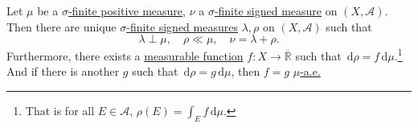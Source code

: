\begin{theorem}\label{thm:Lebesgue-Radon-Nikodym-theorem}
	Let \(\mu\) be a \hyperref[def:finite-signed-measure]{\(\sigma\)-finite positive measure}, \(\nu\) a \hyperref[def:finite-signed-measure]{\(\sigma\)-finite signed measure}
	on \((X, \mathcal{A})\). Then there are unique \hyperref[def:finite-signed-measure]{\(\sigma\)-finite signed measures} \(\lambda,\rho\) on \((X, \mathcal{A})\)
	such that
	\[
		\lambda \perp \mu, \quad \rho \ll \mu, \quad \nu = \lambda + \rho.
	\]
	Furthermore, there exists a \hyperref[def:measurable-function]{measurable function} \(f \colon X \to \overline{\mathbb{R}}\)
	such that \(\,\mathrm{d} \rho = f \,\mathrm{d} \mu\).\footnote{That is for all \(E \in \mathcal{A}\), \(\rho(E) = \int_E f \,\mathrm{d} \mu\).}
	And if there is another \(g\) such that \(\,\mathrm{d} \rho = g \,\mathrm{d} \mu\), then \(f = g\) \hyperref[def:mu-almost-everywhere]{\(\mu\)-a.e.}
\end{theorem}
